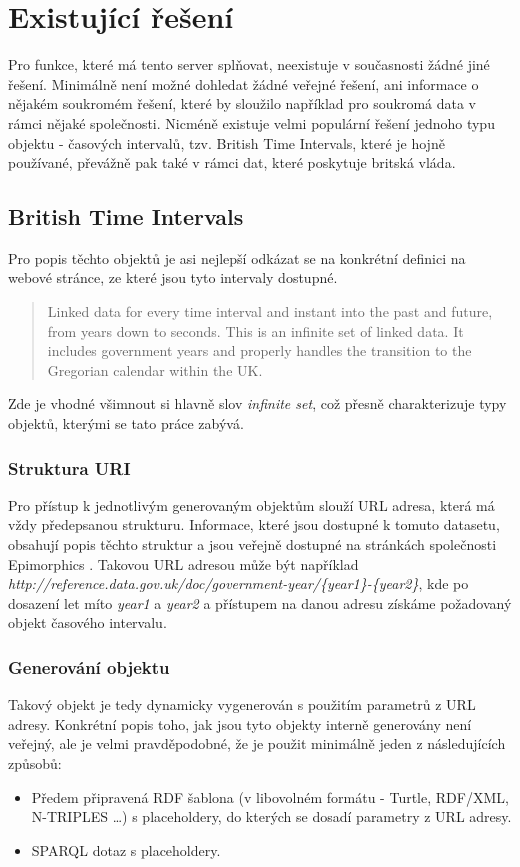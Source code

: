 \documentclass[thesis=B,czech]{FITthesis}[2012/06/26]
\begin{document}
\section{Existující řešení}
Pro funkce, které má tento server splňovat, neexistuje v současnosti žádné jiné řešení. Minimálně není možné dohledat 
  žádné veřejné řešení, ani informace o nějakém soukromém řešení, které by sloužilo například pro soukromá data v rámci nějaké společnosti. 
  Nicméně existuje velmi populární řešení jednoho typu objektu - časových intervalů, tzv. British Time Intervals, které je hojně používané,
  převážně pak také v rámci dat, které poskytuje britská vláda.
  
\subsection{British Time Intervals}
Pro popis těchto objektů je asi nejlepší odkázat se na konkrétní definici na webové stránce, ze které jsou tyto intervaly dostupné.\cite{british_ti}
\begin{quote}
 Linked data for every time interval and instant into the past and future, from years down to seconds.
 This is an infinite set of linked data. It includes government years and properly handles the transition to the Gregorian calendar within the UK.
\end{quote}
 Zde je vhodné všimnout si hlavně slov \textit{infinite set}, což přesně charakterizuje typy objektů, kterými se tato práce zabývá.

 \subsubsection{Struktura URI} Pro přístup k jednotlivým generovaným objektům slouží URL adresa, která má vždy předepsanou strukturu. Informace, které jsou dostupné
k tomuto datasetu, obsahují popis těchto struktur a jsou veřejně dostupné na stránkách společnosti Epimorphics \cite{ti_structure}. Takovou URL adresou může být například 
\textit{http://reference.data.gov.uk/doc/government-year/\{year1\}-\{year2\}}, kde po dosazení let míto \textit{year1} a \textit{year2} a přístupem na danou adresu získáme požadovaný 
objekt časového intervalu.

\subsubsection{Generování objektu} Takový objekt je tedy dynamicky vygenerován s použitím parametrů z URL adresy. Konkrétní popis toho, jak jsou tyto objekty interně generovány 
není veřejný, ale je velmi pravděpodobné, že je použit minimálně jeden z následujících způsobů:
\begin{itemize}
  \item Předem připravená RDF šablona (v libovolném formátu - Turtle, RDF/XML, N-TRIPLES \ldots) s placeholdery, do kterých se dosadí parametry z URL adresy.
  \item SPARQL \cite{sparql_w3c}\cite{sparql_bob} dotaz s placeholdery.
 \end{itemize}
\end{document}
